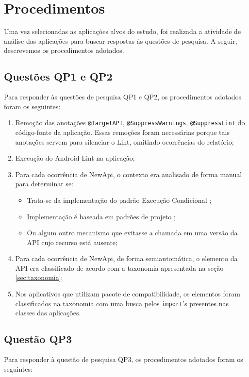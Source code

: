 \section{Procedimentos} \label{sec:procedimentos}

Uma vez selecionadas as aplicações alvos do estudo, foi realizada a atividade de
análise das aplicações para buscar respostas às questões de pesquisa. A seguir,
descrevemos os procedimentos adotados. 

\subsection{Questões QP1 e QP2}
Para responder às questões de pesquisa QP1 e QP2, os procedimentos adotados foram os
seguintes:

\begin{enumerate}
	\item Remoção das anotações \texttt{@TargetAPI}, \texttt{@SuppressWarnings},
	 	\texttt{@SuppressLint} do código-fonte da aplicação. Essas remoções foram
	 	 necessárias porque tais anotações servem para silenciar o Lint, omitindo 
	 	 ocorrências do relatório; 
	\item Execução do Android Lint na aplicação;
	\item Para cada ocorrência de NewApi, o contexto era analisado de forma manual
		para determinar se:
		\begin{itemize}
			\item Trata-se da implementação do padrão Execução Condicional
				\cite{Santos2012};
			\item Implementação é baseada em padrões de projeto \cite{Gamma}; 
			\item Ou algum outro mecanismo que evitasse a chamada em uma versão
			da API cujo recurso está ausente;
		\end{itemize}
	\item Para cada ocorrência de NewApi, de forma semiautomática, o elemento da API
		era classificado de acordo com a taxonomia apresentada na seção \ref{sec:taxonomia};
	\item Nos aplicativos que utilizam pacote de compatibilidade, os elementos foram
		 classificados na taxonomia com uma busca pelos \texttt{import}'s  presentes
		 nas classes das aplicações.
\end{enumerate}

\subsection{Questão QP3}
Para responder à questão de pesquisa QP3, os procedimentos adotados foram os
seguintes:

